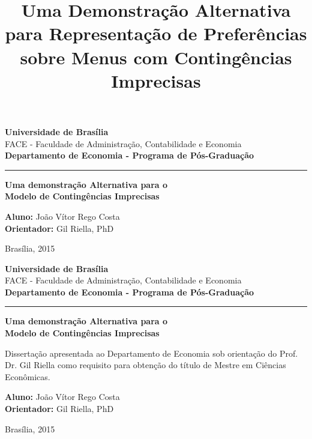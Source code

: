 \documentclass[11pt, a4paper]{article}
\title{Uma Demonstração Alternativa para Representação de Preferências sobre Menus com Contingências Imprecisas}
\author{}
\theoremstyle{nonumberplain}
\theoremstyle{plain}
\theoremstyle{plain}
\theoremstyle{plain}
\theoremstyle{nonumberplain}
\begin{document}
\begin{titlepage}
\begin{flushleft}
\textbf{Universidade de Brasília}\\
FACE - Faculdade de Administração, Contabilidade e Economia\\
\textbf{Departamento de Economia - Programa de Pós-Graduação}

\hrule
\end{flushleft}    

\begin{center}
\vspace*{6cm}
\textbf{\Large Uma demonstração Alternativa para o  \\ Modelo de Contingências Imprecisas}
\end{center}        
\vspace{3.5cm}
\begin{flushright}
\onehalfspacing
\textbf{Aluno:} João Vítor Rego Costa\\
\textbf{Orientador:} Gil Riella, PhD
\end{flushright}
\vfill        
\begin{center}
Brasília, 2015
\end{center}  
\end{titlepage}

\begin{titlepage}
\begin{flushleft}
\textbf{Universidade de Brasília}\\
FACE - Faculdade de Administração, Contabilidade e Economia\\
\textbf{Departamento de Economia - Programa de Pós-Graduação}

\hrule
\end{flushleft}    

\begin{center}
\vspace*{6cm}
\textbf{\large Uma demonstração Alternativa para o  \\ Modelo de Contingências Imprecisas}
\end{center}        
\vspace{1cm}
\begin{flushright}
\begin{minipage}[c]{6cm}
Dissertação apresentada ao Departamento de Economia sob orientação do Prof. Dr. Gil Riella como requisito para obtenção do título de Mestre em Ciências Econômicas.
\end{minipage} 
\end{flushright}
\vspace{1cm}
\begin{flushright}
\onehalfspacing
\textbf{Aluno:} João Vítor Rego Costa\\
\textbf{Orientador:} Gil Riella, PhD
\end{flushright}
\vfill        
\begin{center}
Brasília, 2015
\end{center}  
\end{titlepage}
\end{document}
